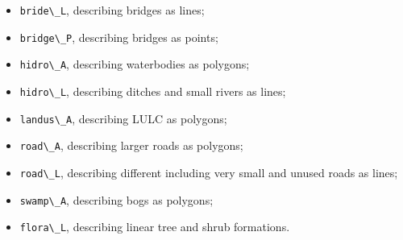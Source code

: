 \documentclass[
]{book}
\newcommand{\passthrough}[1]{#1}
\begin{document}
\begin{itemize}
\item
  \passthrough{\lstinline!bride\_L!}, describing bridges as lines;
\item
  \passthrough{\lstinline!bridge\_P!}, describing bridges as points;
\item
  \passthrough{\lstinline!hidro\_A!}, describing waterbodies as polygons;
\item
  \passthrough{\lstinline!hidro\_L!}, describing ditches and small rivers as lines;
\item
  \passthrough{\lstinline!landus\_A!}, describing LULC as polygons;
\item
  \passthrough{\lstinline!road\_A!}, describing larger roads as polygons;
\item
  \passthrough{\lstinline!road\_L!}, describing different including very small and unused roads as lines;
\item
  \passthrough{\lstinline!swamp\_A!}, describing bogs as polygons;
\item
  \passthrough{\lstinline!flora\_L!}, describing linear tree and shrub formations.
\end{itemize}
\end{document}
